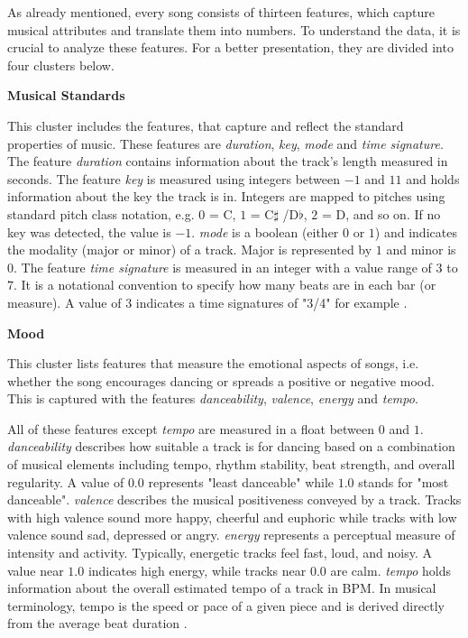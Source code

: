 As already mentioned, every song consists of thirteen features, which capture musical attributes and translate them into numbers.
To understand the data, it is crucial to analyze these features. For a better presentation, they are divided into four clusters below. 

\textbf{Musical Standards}

This cluster includes the features, that capture and reflect the standard properties of music. 
These features are \emph{duration}, \emph{key}, \emph{mode} and \emph{time signature}. 
The feature \emph{duration} contains information about the track's length measured in seconds.
The feature \emph{key} is measured using integers between \(-1\) and \(11\) and 
holds information about the key the track is in.
Integers are mapped to pitches using standard pitch class notation, e.g. \(0\) = C, \(1\) = C\(\sharp\) /D\(\flat\), \(2\) = D, and so on. 
If no key was detected, the value is \(-1\).
\emph{mode} is a boolean (either \(0\) or \(1\)) and indicates the modality (major or minor) of a track.
Major is represented by \(1\) and minor is \(0\). 
The feature \emph{time signature} is measured in an integer with a value range of \(3\) to \(7\).
It is a notational convention to specify how many beats are in each bar (or measure). 
A value of $3$ indicates a time signatures of "3/4" for example \cite[]{Features}.

\newpage
\textbf{Mood}

This cluster lists features that measure the emotional aspects of songs, 
i.e. whether the song encourages dancing or spreads a positive or negative mood.
This is captured with the features \emph{danceability}, \emph{valence}, \emph{energy} and \emph{tempo}.

All of these features except \emph{tempo} are measured in a float between \(0\) and \(1\). 
\emph{danceability} describes how suitable a track is for dancing based on a combination of musical elements
including tempo, rhythm stability, beat strength, and overall regularity.
A value of \(0.0\) represents "least danceable" while $1.0$ stands for "most danceable".
\emph{valence} describes the musical positiveness conveyed by a track. 
Tracks with high valence sound more happy, cheerful and euphoric
while tracks with low valence sound sad, depressed or angry.
\emph{energy} represents a perceptual measure of intensity and activity.
Typically, energetic tracks feel fast, loud, and noisy. 
A value near \(1.0\) indicates high energy, while tracks near \(0.0\) are calm.
\emph{tempo} holds information about the overall estimated tempo of a track in \ac{BPM}.
In musical terminology, tempo is the speed or pace of a given piece and is derived directly from the
average beat duration \cite[]{Features}.

